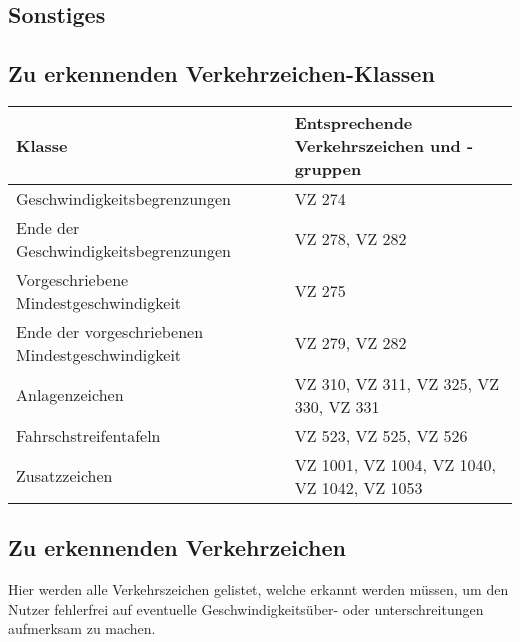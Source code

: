 \begin{appendix}

\chapter{Sonstiges}
\section{Zu erkennenden Verkehrzeichen-Klassen}
\label{sec:list_classes}
\begin{longtabu}{X[l] X[l]}
\hline
\bf Klasse & \bf Entsprechende Verkehrszeichen und -gruppen \\ \hline
Geschwindigkeitsbegrenzungen & \gls{VZ} 274 \\ \hline
Ende der Geschwindigkeitsbegrenzungen & \gls{VZ} 278, \gls{VZ} 282 \\ \hline
Vorgeschriebene Mindestgeschwindigkeit & \gls{VZ} 275 \\ \hline
Ende der vorgeschriebenen Mindestgeschwindigkeit & \gls{VZ} 279, \gls{VZ} 282 \\ \hline
Anlagenzeichen & \gls{VZ} 310, \gls{VZ} 311, \gls{VZ} 325, \gls{VZ} 330, \gls{VZ} 331 \\ \hline
Fahrschstreifentafeln & \gls{VZ} 523, \gls{VZ} 525, \gls{VZ} 526 \\ \hline
Zusatzzeichen & \gls{VZ} 1001, \gls{VZ} 1004, \gls{VZ} 1040, \gls{VZ} 1042, \gls{VZ} 1053	\\ \hline
\hline
\end{longtabu}

\section{Zu erkennenden Verkehrzeichen}
\label{sec:liste_zu_erkennende_verkehrszeichen}
Hier werden alle Verkehrszeichen gelistet, welche erkannt werden müssen, um den \gls{Nutzer} fehlerfrei auf eventuelle Geschwindigkeitsüber- oder unterschreitungen aufmerksam zu machen.


\end{appendix}
